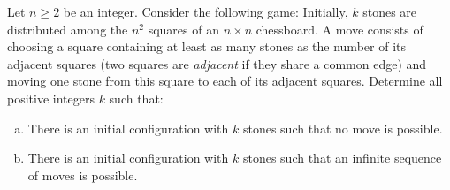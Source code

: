 Let $n\geq 2$ be an integer.
Consider the following game:
Initially, $k$ stones are distributed among the $n^2$ squares of an $n\times n$ chessboard.
A move consists of choosing a square containing at least as many stones as the number of its adjacent squares
(two squares are \textit{adjacent} if they share a common edge)
and moving one stone from this square to each of its adjacent squares.
Determine all positive integers $k$ such that:
\begin{enumerate}[(a)]
\item There is an initial configuration with $k$ stones such that no move is possible.
\item There is an initial configuration with $k$ stones such that an infinite sequence of moves is possible.
\end{enumerate}
